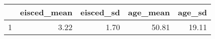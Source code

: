 \begin{table}[ht]
\centering
\begin{tabular}{rrrrr}
  \hline
 & eisced\_mean & eisced\_sd & age\_mean & age\_sd \\ 
  \hline
1 & 3.22 & 1.70 & 50.81 & 19.11 \\ 
   \hline
\end{tabular}
\end{table}

